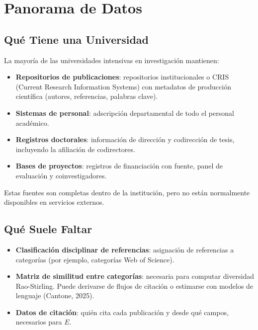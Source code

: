 \documentclass[
]{article}
\providecommand{\tightlist}{%
  \setlength{\itemsep}{0pt}\setlength{\parskip}{0pt}}
\begin{document}
\hypertarget{panorama-de-datos}{%
\section{Panorama de Datos}\label{panorama-de-datos}}

\hypertarget{quuxe9-tiene-una-universidad}{%
\subsection{Qué Tiene una
Universidad}\label{quuxe9-tiene-una-universidad}}

La mayoría de las universidades intensivas en investigación mantienen:

\begin{itemize}
\tightlist
\item
  \textbf{Repositorios de publicaciones}: repositorios institucionales o
  CRIS (Current Research Information Systems) con metadatos de
  producción científica (autores, referencias, palabras clave).
\item
  \textbf{Sistemas de personal}: adscripción departamental de todo el
  personal académico.
\item
  \textbf{Registros doctorales}: información de dirección y codirección
  de tesis, incluyendo la afiliación de codirectores.
\item
  \textbf{Bases de proyectos}: registros de financiación con fuente,
  panel de evaluación y coinvestigadores.
\end{itemize}

Estas fuentes son completas dentro de la institución, pero no están
normalmente disponibles en servicios externos.

\hypertarget{quuxe9-suele-faltar}{%
\subsection{Qué Suele Faltar}\label{quuxe9-suele-faltar}}

\begin{itemize}
\tightlist
\item
  \textbf{Clasificación disciplinar de referencias}: asignación de
  referencias a categorías (por ejemplo, categorías Web of Science).
\item
  \textbf{Matriz de similitud entre categorías}: necesaria para computar
  diversidad Rao-Stirling. Puede derivarse de flujos de citación o
  estimarse con modelos de lenguaje (Cantone, 2025).
\item
  \textbf{Datos de citación}: quién cita cada publicación y desde qué
  campos, necesarios para \(E\).
\end{itemize}
\end{document}
